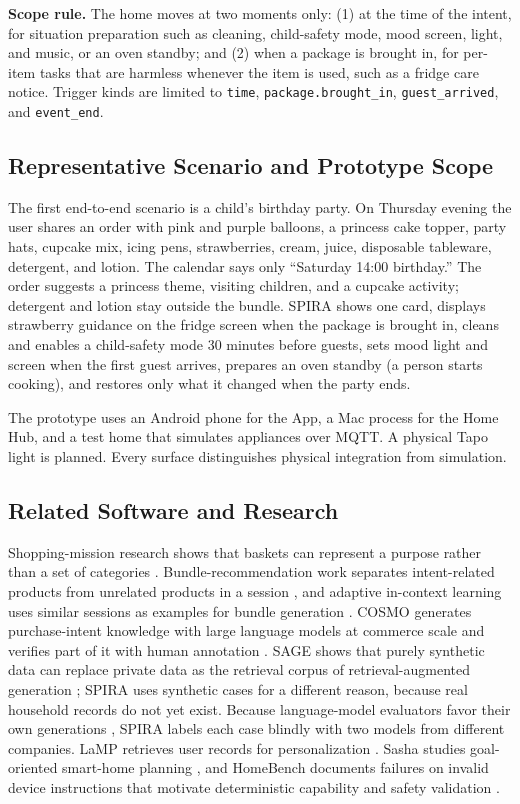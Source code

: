 \documentclass[conference]{IEEEtran}
\begin{document}
\textbf{Scope rule.} The home moves at two moments only: (1) at the time of the intent, for situation preparation such as cleaning, child-safety mode, mood screen, light, and music, or an oven standby; and (2) when a package is brought in, for per-item tasks that are harmless whenever the item is used, such as a fridge care notice. Trigger kinds are limited to \texttt{time}, \texttt{package.brought\_in}, \texttt{guest\_arrived}, and \texttt{event\_end}.

\subsection{Representative Scenario and Prototype Scope}
The first end-to-end scenario is a child's birthday party. On Thursday evening the user shares an order with pink and purple balloons, a princess cake topper, party hats, cupcake mix, icing pens, strawberries, cream, juice, disposable tableware, detergent, and lotion. The calendar says only ``Saturday 14:00 birthday.'' The order suggests a princess theme, visiting children, and a cupcake activity; detergent and lotion stay outside the bundle. SPIRA shows one card, displays strawberry guidance on the fridge screen when the package is brought in, cleans and enables a child-safety mode 30 minutes before guests, sets mood light and screen when the first guest arrives, prepares an oven standby (a person starts cooking), and restores only what it changed when the party ends.

The prototype uses an Android phone for the App, a Mac process for the Home Hub, and a test home that simulates appliances over MQTT. A physical Tapo light is planned. Every surface distinguishes physical integration from simulation.

\subsection{Related Software and Research}
Shopping-mission research shows that baskets can represent a purpose rather than a set of categories \cite{ref1}. Bundle-recommendation work separates intent-related products from unrelated products in a session \cite{ref2}, and adaptive in-context learning uses similar sessions as examples for bundle generation \cite{ref3}. COSMO generates purchase-intent knowledge with large language models at commerce scale and verifies part of it with human annotation \cite{ref4}. SAGE shows that purely synthetic data can replace private data as the retrieval corpus of retrieval-augmented generation \cite{ref5}; SPIRA uses synthetic cases for a different reason, because real household records do not yet exist. Because language-model evaluators favor their own generations \cite{ref16}, SPIRA labels each case blindly with two models from different companies. LaMP retrieves user records for personalization \cite{ref6}. Sasha studies goal-oriented smart-home planning \cite{ref7}, and HomeBench documents failures on invalid device instructions that motivate deterministic capability and safety validation \cite{ref8}.
\end{document}
